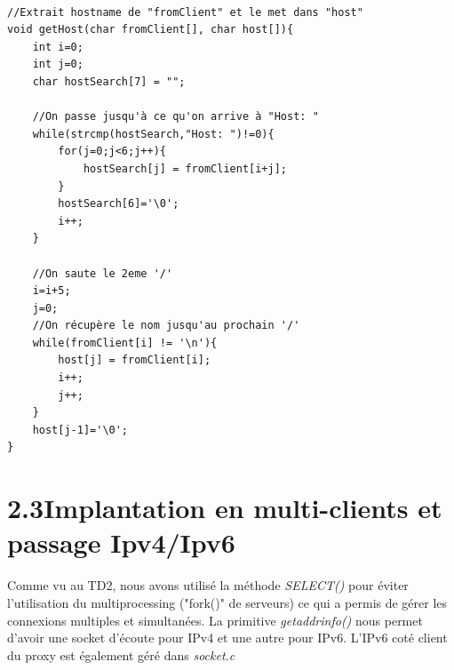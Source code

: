 \documentclass[12pt, a4paper]{report}
\begin{document}
\lstset{language=C}

\renewcommand{\lstlistingname}{Algorithm 2.2.}
\begin{lstlisting}[caption=Algorithme de détermination d'adresse serveur à contacter (messages.c)]

//Extrait hostname de "fromClient" et le met dans "host"
void getHost(char fromClient[], char host[]){
	int i=0;
	int j=0;
	char hostSearch[7] = "";

	//On passe jusqu'à ce qu'on arrive à "Host: "
	while(strcmp(hostSearch,"Host: ")!=0){
		for(j=0;j<6;j++){
			hostSearch[j] = fromClient[i+j];
		}
		hostSearch[6]='\0';
		i++;
	}
	
	//On saute le 2eme '/'
	i=i+5;
	j=0;
	//On récupère le nom jusqu'au prochain '/'
	while(fromClient[i] != '\n'){
		host[j] = fromClient[i];
		i++;
		j++;
	}
	host[j-1]='\0';
}

\end{lstlisting}

\newpage


\section*{\hspace{0.6cm}2.3\hspace{0.6cm}Implantation en multi-clients et passage Ipv4/Ipv6}
\hspace{1cm} Comme vu au TD2, nous avons utilisé la méthode \textit{SELECT()} pour éviter l'utilisation du multiprocessing ("fork()" de serveurs) ce qui a permis de gérer les connexions multiples et simultanées. La primitive \textit{getaddrinfo()} nous permet d'avoir une socket d'écoute pour IPv4 et une autre pour IPv6. L'IPv6 coté client du proxy est également géré dans \textit{socket.c}\\

\lstset{language=C}
\end{document}
